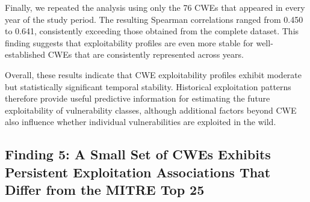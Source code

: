 \documentclass[conference,compsoc]{IEEEtran}
\begin{document}
Finally, we repeated the analysis using only the 76 CWEs that appeared in every year of the study period. The resulting Spearman correlations ranged from 0.450 to 0.641, consistently exceeding those obtained from the complete dataset. This finding suggests that exploitability profiles are even more stable for well-established CWEs that are consistently represented across years.

Overall, these results indicate that CWE exploitability profiles exhibit moderate but statistically significant temporal stability. Historical exploitation patterns therefore provide useful predictive information for estimating the future exploitability of vulnerability classes, although additional factors beyond CWE also influence whether individual vulnerabilities are exploited in the wild.








\subsection{Finding 5: A Small Set of CWEs Exhibits Persistent Exploitation Associations That Differ from the MITRE Top 25}
\end{document}
